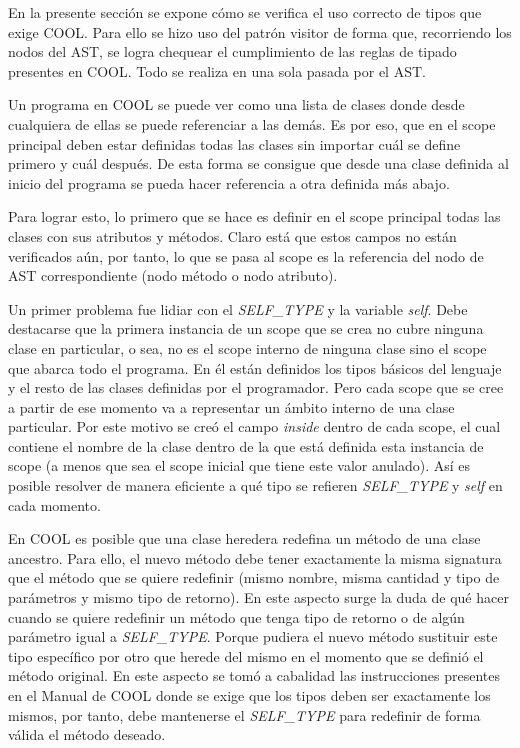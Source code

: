 \documentclass{article}
\begin{document}
	En la presente secci\'on se expone c\'omo se verifica el uso correcto de tipos que exige COOL. Para ello se hizo uso del patr\'on visitor de forma que, recorriendo los nodos del AST, se logra chequear el cumplimiento de las reglas de tipado presentes en COOL. Todo se realiza en una sola pasada por el AST.
	
	Un programa en COOL se puede ver como una lista de clases donde desde cualquiera de ellas se puede referenciar a las dem\'as. Es por eso, que en el scope principal deben estar definidas todas las clases sin importar cu\'al se define primero y cu\'al despu\'es. De esta forma se consigue que desde una clase definida al inicio del programa se pueda hacer referencia a otra definida m\'as abajo.
	
	Para lograr esto, lo primero que se hace es definir en el scope principal todas las clases con sus atributos y m\'etodos. Claro est\'a que estos campos no est\'an verificados a\'un, por tanto, lo que se pasa al scope es la referencia del nodo de AST correspondiente (nodo m\'etodo o nodo atributo).
	
	Un primer problema fue lidiar con el \textit{SELF\_TYPE} y la variable \textit{self}. Debe destacarse que la primera instancia de un scope que se crea no cubre ninguna clase en particular, o sea, no es el scope interno de ninguna clase sino el scope que abarca todo el programa. En \'el est\'an definidos los tipos b\'asicos del lenguaje y el resto de las clases definidas por el programador. Pero cada scope que se cree a partir de ese momento va a representar un \'ambito interno de una clase particular. Por este motivo se cre\'o el campo \textit{inside} dentro de cada scope, el cual contiene el nombre de la clase dentro de la que est\'a definida esta instancia de scope (a menos que sea el scope inicial que tiene este valor anulado). As\'{i} es posible resolver de manera eficiente a qu\'e tipo se refieren \textit{SELF\_TYPE} y \textit{self} en cada momento.
	
	En COOL es posible que una clase heredera redefina un m\'etodo de una clase ancestro. Para ello, el nuevo m\'etodo debe tener exactamente la misma signatura que el m\'etodo que se quiere redefinir (mismo nombre, misma cantidad y tipo de par\'ametros y mismo tipo de retorno). En este aspecto surge la duda de qu\'e hacer cuando se quiere redefinir un m\'etodo que tenga tipo de retorno o de alg\'un par\'ametro igual a \textit{SELF\_TYPE}. Porque pudiera el nuevo m\'etodo sustituir este tipo espec\'{i}fico por otro que herede del mismo en el momento que se defini\'o el m\'etodo original. En este aspecto se tom\'o a cabalidad las instrucciones presentes en el Manual de COOL donde se exige que los tipos deben ser exactamente los mismos, por tanto, debe mantenerse el \textit{SELF\_TYPE} para redefinir de forma v\'alida el m\'etodo deseado.
	
\end{document}
